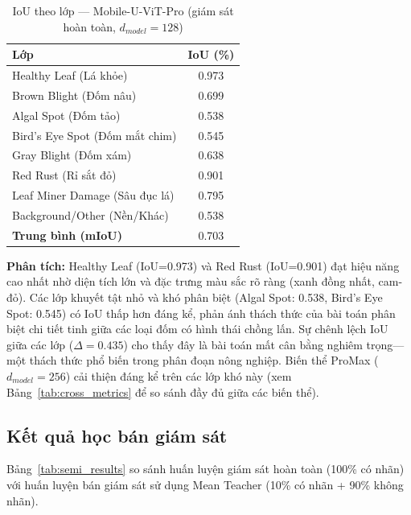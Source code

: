 \documentclass[conference]{IEEEtran}
\begin{document}
\begin{table}[t]
\centering
\caption{IoU theo lớp --- Mobile-U-ViT-Pro (giám sát hoàn toàn, $d_{model}=128$)}
\label{tab:per_class}
\begin{tabular}{l|c}
\toprule
\textbf{Lớp} & \textbf{IoU (\%)} \\
\midrule
Healthy Leaf (Lá khỏe) & 0.973 \\
Brown Blight (Đốm nâu) & 0.699 \\
Algal Spot (Đốm tảo) & 0.538 \\
Bird's Eye Spot (Đốm mắt chim) & 0.545 \\
Gray Blight (Đốm xám) & 0.638 \\
Red Rust (Rỉ sắt đỏ) & 0.901 \\
Leaf Miner Damage (Sâu đục lá) & 0.795 \\
Background/Other (Nền/Khác) & 0.538 \\
\midrule
\textbf{Trung bình (mIoU)} & 0.703 \\
\bottomrule
\end{tabular}
\end{table}

\noindent \textbf{Phân tích:} Healthy Leaf (IoU=0.973) và Red Rust (IoU=0.901) đạt hiệu năng cao nhất nhờ diện tích lớn và đặc trưng màu sắc rõ ràng (xanh đồng nhất, cam-đỏ). Các lớp khuyết tật nhỏ và khó phân biệt (Algal Spot: 0.538, Bird's Eye Spot: 0.545) có IoU thấp hơn đáng kể, phản ánh thách thức của bài toán phân biệt chi tiết tinh giữa các loại đốm có hình thái chồng lấn. Sự chênh lệch IoU giữa các lớp ($\Delta=0.435$) cho thấy đây là bài toán mất cân bằng nghiêm trọng---một thách thức phổ biến trong phân đoạn nông nghiệp. Biến thể ProMax ($d_{model}=256$) cải thiện đáng kể trên các lớp khó này (xem Bảng~\ref{tab:cross_metrics} để so sánh đầy đủ giữa các biến thể).

\subsection{Kết quả học bán giám sát}

Bảng~\ref{tab:semi_results} so sánh huấn luyện giám sát hoàn toàn (100\% có nhãn) với huấn luyện bán giám sát sử dụng Mean Teacher (10\% có nhãn + 90\% không nhãn).
\end{document}
